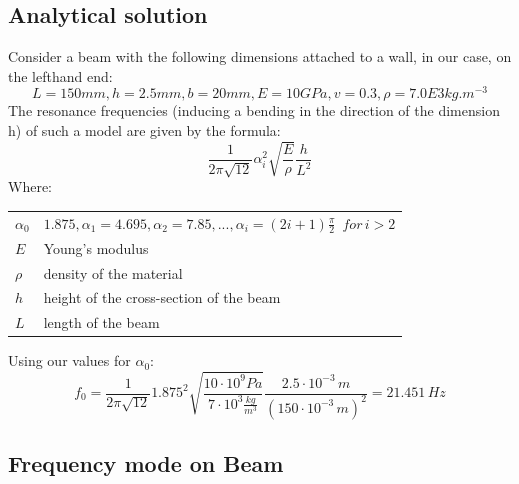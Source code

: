 \documentclass[12pt]{article}
\makeatletter
\newenvironment{conditions}
  {\par\vspace{\abovedisplayskip}\noindent\begin{tabular}{>{$}l<{$} @{${}={}$} l}}
  {\end{tabular}\par\vspace{\belowdisplayskip}}
\makeatother
\begin{document}
\subsection{Analytical solution}
Consider a beam with the following dimensions attached to a wall, in our case, 
on the lefthand end:
\begin{equation}\label{eq:1}
  L=150mm, h=2.5mm, b=20mm, E=10GPa, v=0.3, \rho=7.0E3kg.m^{-3}
\end{equation}
The resonance frequencies (inducing a bending in the direction of the dimension h) of
such a model are given by the formula:
\begin{equation}\label{eq:2}
  \frac{1}{2\pi\sqrt{12}}\alpha_i^2\sqrt{\frac{E}{\rho}}\frac{h}{L^2}
\end{equation}
Where:
\begin{conditions}
  \alpha_0 & $1.875,\alpha_1=4.695,\alpha_2=7.85,...,\alpha_i=(2i+1)\frac{\pi}{2} \enspace  for \, i>2$ \\
  E     &  Young's modulus \\
  \rho  &  density of the material \\   
  h     &  height of the cross-section of the beam \\
  L     &  length of the beam
\end{conditions}
\noindent Using our values for $\alpha_0$:
\begin{equation}\label{eq:3}
  f_0 = \frac{1}{2\pi\sqrt{12}}1.875^2\sqrt{\frac{10 \cdot 10^9 Pa}{7\cdot10^3 
  \frac{kg}{m^3}}}\frac{2.5 \cdot 10^{-3} \, m}{(150 \cdot 10^{-3} \, m)^2} = 21.451 \, Hz
\end{equation}
\newpage
\subsection{Frequency mode on Beam}
\end{document}
